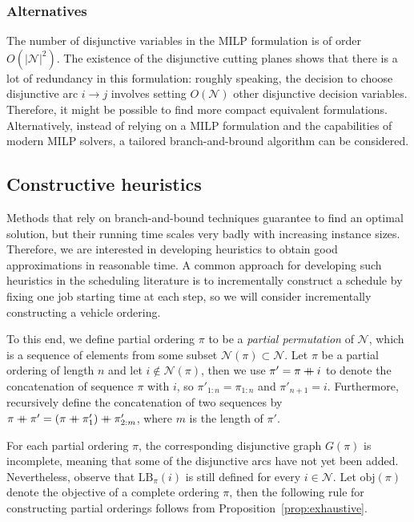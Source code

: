 \documentclass[a4paper]{article}
\newcommand\mdoubleplus{\mathbin{+\mkern-10mu+}}
\theoremstyle{definition}
\theoremstyle{plain}
\begin{document}
\subsubsection*{Alternatives}
The number of disjunctive variables in the MILP formulation is of order $O(|\mathcal{N}|^{2})$.
%
The existence of the disjunctive cutting planes shows that there is a lot of redundancy in this formulation: roughly speaking, the decision to choose disjunctive arc $i \rightarrow j$ involves setting $O(\mathcal{N})$ other disjunctive decision variables.
%
Therefore, it might be possible to find more compact equivalent formulations.
%
Alternatively, instead of relying on a MILP formulation and the capabilities of
modern MILP solvers, a tailored branch-and-bround algorithm can be considered.


\newpage

\subsection*{Constructive heuristics}

Methods that rely on branch-and-bound techniques guarantee to find an optimal
solution, but their running time scales very badly with increasing instance
sizes. Therefore, we are interested in developing heuristics to obtain good
approximations in reasonable time. A common approach for developing such
heuristics in the scheduling literature is to incrementally construct a schedule
by fixing one job starting time at each step, so we will consider incrementally
constructing a vehicle ordering.

To this end, we define partial ordering $\pi$ to be a \textit{partial permutation} of
$\mathcal{N}$, which is a sequence of elements from some subset
$\mathcal{N}(\pi) \subset \mathcal{N}$.
%
Let $\pi$ be a partial ordering of length $n$ and let
$i \notin \mathcal{N}(\pi)$, then we use $\pi' = \pi \mdoubleplus i$ to denote
the concatenation of sequence $\pi$ with $i$, so $\pi'_{1:n} = \pi_{1:n}$ and
$\pi'_{n+1} = i$. Furthermore, recursively define the concatenation of two
sequences by
$\pi \mdoubleplus \pi' = ( \pi \mdoubleplus \pi'_{1} ) \mdoubleplus \pi'_{2:m}$,
where $m$ is the length of $\pi'$.

For each partial ordering $\pi$, the corresponding disjunctive graph $G(\pi)$ is
incomplete, meaning that some of the disjunctive arcs have not yet been added.
Nevertheless, observe that $\text{LB}_{\pi}(i)$ is still defined for every
$i \in \mathcal{N}$.
%
Let $\text{obj}(\pi)$ denote the objective of a complete ordering $\pi$, then
the following rule for constructing partial orderings follows from
Proposition~\ref{prop:exhaustive}.
\end{document}

